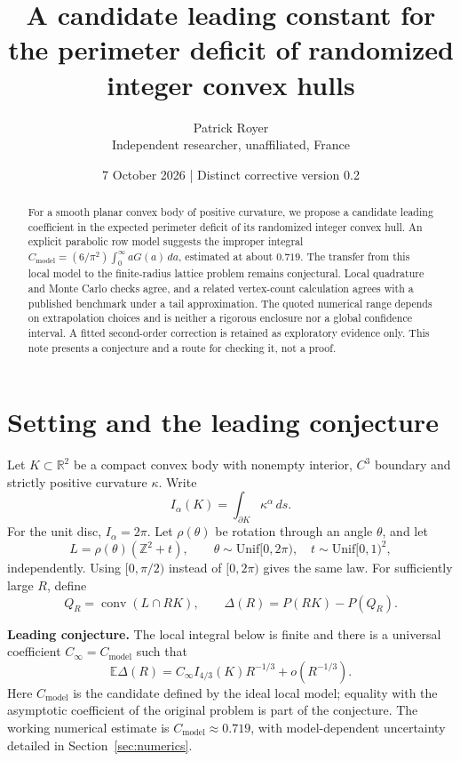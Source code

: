 \documentclass[11pt,a4paper]{article}
\title{\vspace{-12mm}\textbf{A candidate leading constant for the perimeter deficit of randomized integer convex hulls}}
\author{Patrick Royer\\\small Independent researcher, unaffiliated, France}
\date{7 October 2026 | Distinct corrective version 0.2}
\newcommand{\E}{\mathbb E}
\newcommand{\Z}{\mathbb Z}
\newcommand{\R}{\mathbb R}
\newcommand{\Cmodel}{C_{\mathrm{model}}}
\begin{document}
\maketitle
\vspace{-5mm}
\begin{abstract}
For a smooth planar convex body of positive curvature, we propose a candidate leading coefficient in the expected perimeter deficit of its randomized integer convex hull. An explicit parabolic row model suggests the improper integral $\Cmodel=(6/\pi^2)\int_0^\infty aG(a)\,da$, estimated at about $0.719$. The transfer from this local model to the finite-radius lattice problem remains conjectural. Local quadrature and Monte Carlo checks agree, and a related vertex-count calculation agrees with a published benchmark under a tail approximation. The quoted numerical range depends on extrapolation choices and is neither a rigorous enclosure nor a global confidence interval. A fitted second-order correction is retained as exploratory evidence only. This note presents a conjecture and a route for checking it, not a proof.
\end{abstract}

\section{Setting and the leading conjecture}
Let $K\subset\R^2$ be a compact convex body with nonempty interior, $C^3$ boundary and strictly positive curvature $\kappa$. Write
\[
 I_\alpha(K)=\int_{\partial K}\kappa^\alpha\,ds.
\]
For the unit disc, $I_\alpha=2\pi$. Let $\rho(\theta)$ be rotation through an angle $\theta$, and let
\[
 L=\rho(\theta)(\Z^2+t),\qquad
 \theta\sim\mathrm{Unif}[0,2\pi),\quad
 t\sim\mathrm{Unif}[0,1)^2,
\]
independently. Using $[0,\pi/2)$ instead of $[0,2\pi)$ gives the same law. For sufficiently large $R$, define
\[
 Q_R=\operatorname{conv}(L\cap RK),\qquad
 \Delta(R)=P(RK)-P(Q_R).
\]

\textbf{Leading conjecture.} The local integral below is finite and there is a universal coefficient $C_\infty=\Cmodel$ such that
\begin{equation}\label{eq:leading}
 \E\Delta(R)=C_\infty I_{4/3}(K)R^{-1/3}+o(R^{-1/3}).
\end{equation}
Here $\Cmodel$ is the candidate defined by the ideal local model; equality with the asymptotic coefficient of the original problem is part of the conjecture. The working numerical estimate is $\Cmodel\approx0.719$, with model-dependent uncertainty detailed in Section~\ref{sec:numerics}.
\end{document}
